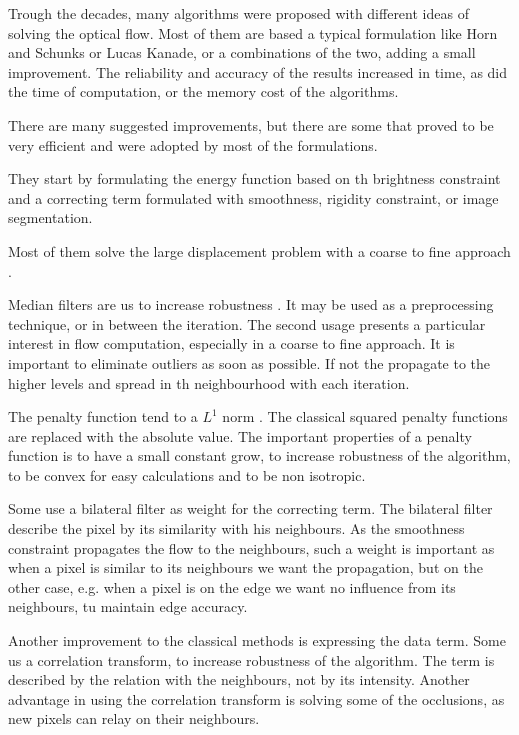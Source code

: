 \documentclass[12pt,a4paper,twoside]{report}
\begin{document}
Trough the decades, many algorithms were proposed with different ideas of solving the optical flow. Most of them are based a typical formulation like Horn and Schunks or Lucas Kanade, or a combinations of the two, adding a small improvement. The reliability and  accuracy of the results increased in time, as did the time of computation, or the memory cost of the algorithms. 

There are many suggested improvements, but there are some that proved to be very efficient and were adopted by most of the formulations.

They start by formulating the energy function based on th brightness constraint and a correcting term formulated with smoothness, rigidity constraint,  or image segmentation. 

Most of them solve the large displacement problem with a coarse to fine approach \cite{bergen1992hierarchical}.

Median filters are us to increase robustness \cite{bab1998robust}. It may be used as a preprocessing technique, or in between the iteration. The second usage presents a particular interest in flow computation, especially in a coarse to fine approach. It is important to eliminate outliers as soon as possible. If not the propagate to the higher levels and spread in th neighbourhood with each iteration.

The penalty function tend to a $L^1$ norm \cite{wedel2008,wedel2009}. The classical squared penalty functions are replaced with the absolute value. The important properties of a penalty function is to have a small constant grow, to increase robustness of the algorithm, to be convex for easy calculations and to be non isotropic.

Some use a bilateral filter as weight for the correcting term\cite{drulea2013}. The bilateral filter describe the pixel by its similarity with his neighbours. As the smoothness constraint propagates the flow to the neighbours, such a weight is important as when a pixel is similar to its neighbours we want the propagation, but on the other case, e.g. when a pixel is on the edge we want no influence from its neighbours, tu maintain edge accuracy. 

Another improvement to the classical methods is expressing the data term. Some us a correlation transform, to increase robustness of the algorithm\cite{molnar2010illumination}. The term is described by the relation with the neighbours, not by its intensity. Another advantage in using the correlation transform is solving some of the occlusions, as new pixels can relay on their neighbours.
\end{document}
